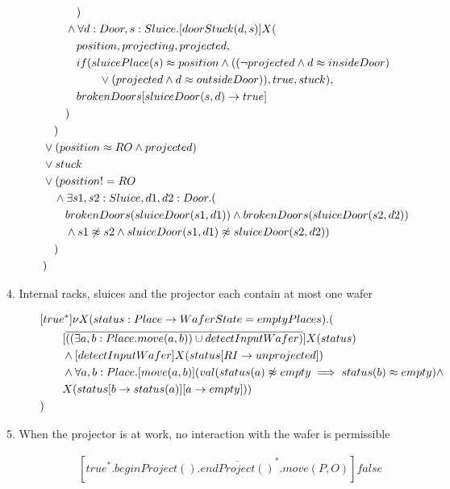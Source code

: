 \begin{description}
\begin{align*}
& \tab\tab\tab ) \\
&  \tab\tab  \wedge \forall d:Door,s:Sluice.[doorStuck(d, s)]X( \\
&  \tab\tab    \tab position,   projecting,  projected, \\
&  \tab\tab   \tab                        if(sluicePlace(s) \approx position \wedge ((\neg projected \wedge d \approx insideDoor) \\
& \tab\tab\tab\tab\tab \vee (projected \wedge d \approx outsideDoor)), true, stuck), \\
&  \tab\tab                       \tab brokenDoors[sluiceDoor(s,d)\to true] \\
&  \tab\tab                                              ) \\
&  \tab ) \\
&  \vee (position \approx RO \wedge projected) \\
& \vee stuck \\
& \vee (position != RO \\ 
& \tab \wedge \exists s1,s2:Sluice,d1,d2:Door.( \\
& \tab \tab brokenDoors(sluiceDoor(s1, d1)) \wedge brokenDoors(sluiceDoor(s2, d2)) \\
&\tab\tab \wedge s1 \not \approx s2 \wedge sluiceDoor(s1, d1) \not \approx sluiceDoor(s2, d2)) \\
&\tab ) \\
&)
	\end{align*}

 
 \item[4. Internal racks, sluices and the projector each contain at most one wafer]
    
\begin{align*}
		&[true^*] \nu X(status:Place \to WaferState=emptyPlaces).(\\
  & \tab\tab [\overline{((\exists a,b:Place.move(a,b)) \cup detectInputWafer)}]X(status)\\
  & \tab\tab  \wedge [detectInputWafer]X(status[RI \to unprojected])\\
  & \tab\tab  \wedge \forall a,b:Place.[move(a, b)](val(status(a) \not \approx empty \implies status(b)  \approx empty) \wedge \\ & \tab \tab X(status[b \to status(a)][a \to empty]))\\
&)
	\end{align*}

 
 \item[5. When the projector is at work, no interaction with the wafer is permissible]
 	\begin{align*}
 		&[true^*.beginProject().\overline{endProject()}^*.move(P,O)]false
	\end{align*}
	

\end{description}
